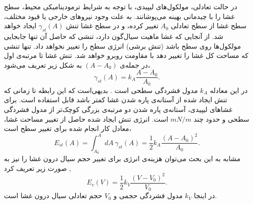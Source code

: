 در حالت تعادلی، مولکول‌های لیپیدی، با توجه به شرایط ترمودینامیکی محیط، سطح غشا را با چیدمانی بهینه‌ می‌پوشانند.  به علت وجود نیروهای خارجی یا قیود مختلف،  سطح غشا از سطح تعادلی
$A_0$
تغییر کرده، و در سطح غشا تنش  
$\gamma_{st}(A)$
ایجاد خواهد شد. از آنجایی که غشا ماهیت سیال‌گون دارد،  تنشی که حاصل آن تنها جابجایی مولکول‌ها روی سطح باشد (تنش برشی)
 انرژی سطح را تغییر نخواهد داد. تنها تنشی که مساحت کل غشا را تغییر دهد با مقاومت روبرو خواهد شد. تنش غشا تا مرتبه‌ی اول در جمله‌ی 
$(A-A_0)$
به شکل زیر تعریف می‌شود،
\begin{equation}
\gamma_{st}(A)=k_A\frac{A-A_0}{A_0}.
\end{equation}
در این معادله
$k_A$
مدول فشردگی سطحی
است
\cite{thegiantvesiclebook2019}.
 بدیهی‌است که این رابطه تا زمانی که تنش ایجاد شده از  آستانه‌ی پاره شدن غشا کمتر باشد قابل استفاده است. برای غشاهای لیپیدی، آستانه‌ی پاره شدن دو مرتبه‌ی بزرگی کوچک‌تر از مدول فشردگی سطحی و حدود چند
$mN/m$
است. انرژی تنش ایجاد شده حاصل از تغییر مساحت غشا، معادل کار انجام شده برای تغییر سطح است،
\begin{equation}
E_{st}(A)=\int_{A_0}^A dA~\gamma_{st}(A)=\frac{1}{2}k_A\frac{(A-A_0)^2}{A_0}.
\label{eq:surfaceTension}
\end{equation}
مشابه به این بحث می‌توان هزینه‌ی انرژی برای تغییر حجم سیال درون غشا را نیز به صورت زیر تعریف کرد
\cite{discher1998biophysicaljournal},
\begin{equation}
E_{v}(V)=\frac{1}{2}k_V\frac{(V-V_0)^2}{V_0}.
\label{eq:volumeEnergy}
\end{equation}
  در اینجا
$k_V$
مدول فشردگی حجمی
 و 
$V_0$
حجم تعادلی سیال درون غشا است.







